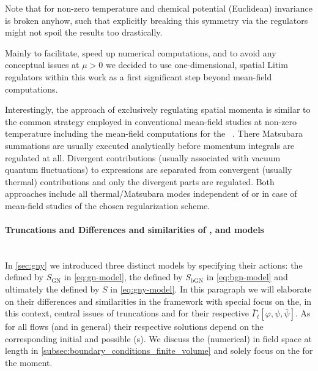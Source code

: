 Note that for non-zero temperature and chemical potential (Euclidean) \Poincare{} invariance is broken anyhow, such that explicitly breaking this symmetry via the regulators might not spoil the results too drastically.

Mainly to facilitate, speed up numerical computations, and to avoid any conceptual issues at $\mu > 0$ we decided to use one-dimensional, spatial Litim regulators within this work as a first significant step beyond mean-field computations.
	
Interestingly, the approach of exclusively regulating spatial momenta is similar to the common strategy employed in conventional mean-field studies at non-zero temperature including the mean-field computations for the \gnyBm{}~\cite{Dolan:1973qd,Harrington:1974tf,Jacobs:1974ys,Dashen:1974xz,Dashen:1975xh,Wolff:1985av}.
There Matsubara summations are usually executed analytically before momentum integrals are regulated at all.
Divergent contributions (usually associated with vacuum quantum fluctuations) to expressions are separated from convergent (usually thermal) contributions and only the divergent parts are regulated.
Both approaches include all thermal/Matsubara modes independent of \rgscale{}  or in case of mean-field studies of the chosen regularization scheme.
	
\paragraph{Truncations and \ics{} \dash{} Differences and similarities of \gn{}, \bgn{} and \gny{} models}\label{paragraph:GNbGNGNY}\mbox{}\\%
In \cref{sec:gny} we introduced three distinct models by specifying their actions: the \gnm{} defined by $S_\mathrm{GN}$ in \cref{eq:gn-model}, the \bgnm{} defined by $S_\mathrm{bGN}$ in \cref{eq:bgn-model} and ultimately the \gnym{} defined by $S$ in \cref{eq:gny-model}. 
In this paragraph we will elaborate on their differences and similarities in the \frg{} framework with special focus on the, in this context, central issues of truncations and \ics{} for their respective \eaas{} $\bar{\Gamma}_t [\varphi, \psi, \bar{\psi}]$.
As for all \frg{} flows (and \pdes{} in general) their respective solutions depend on the corresponding initial and possible \bc{}(s).
We discuss the (numerical) \bcs{} in field space at length in \cref{subsec:boundary_conditions_finite_volume} and solely focus on the \ic{} for the moment.

